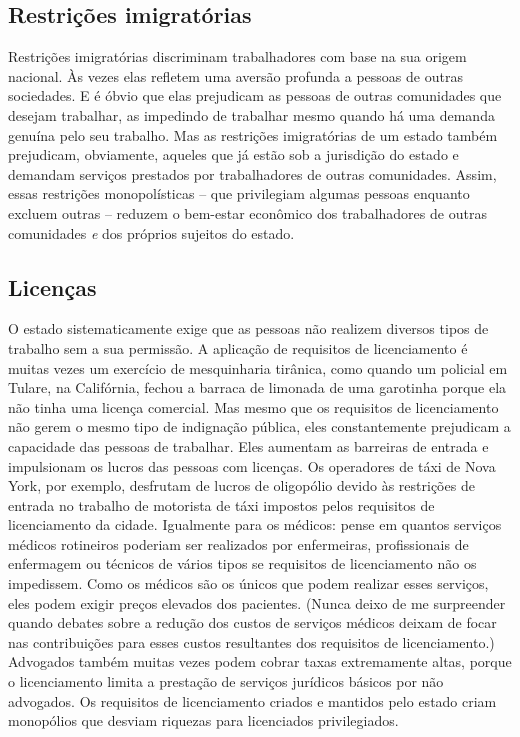 \subsection*{Restrições imigratórias}

Restrições imigratórias discriminam trabalhadores com base na sua origem nacional. Às vezes elas refletem uma aversão profunda a pessoas de outras sociedades. E é óbvio que elas prejudicam as pessoas de outras comunidades que desejam trabalhar, as impedindo de trabalhar mesmo quando há uma demanda genuína pelo seu trabalho. Mas as restrições imigratórias de um estado também prejudicam, obviamente, aqueles que já estão sob a jurisdição do estado e demandam serviços prestados por trabalhadores de outras comunidades. Assim, essas restrições monopolísticas -- que privilegiam algumas pessoas enquanto excluem outras -- reduzem o bem-estar econômico dos trabalhadores de outras comunidades \emph{e} dos próprios sujeitos do estado.

\subsection*{Licenças}

O estado sistematicamente exige que as pessoas não realizem diversos tipos de trabalho sem a sua permissão. A aplicação de requisitos de licenciamento é muitas vezes um exercício de mesquinharia tirânica, como quando um policial em Tulare, na Califórnia, fechou a barraca de limonada de uma garotinha porque ela não tinha uma licença comercial. Mas mesmo que os requisitos de licenciamento não gerem o mesmo tipo de indignação pública, eles constantemente prejudicam a capacidade das pessoas de trabalhar. Eles aumentam as barreiras de entrada e impulsionam os lucros das pessoas com licenças. Os operadores de táxi de Nova York, por exemplo, desfrutam de lucros de oligopólio devido às restrições de entrada no trabalho de motorista de táxi impostos pelos requisitos de licenciamento da cidade. Igualmente para os médicos: pense em quantos serviços médicos rotineiros poderiam ser realizados por enfermeiras, profissionais de enfermagem ou técnicos de vários tipos se requisitos de licenciamento não os impedissem. Como os médicos são os únicos que podem realizar esses serviços, eles podem exigir preços elevados dos pacientes. (Nunca deixo de me surpreender quando debates sobre a redução dos custos de serviços médicos deixam de focar nas contribuições para esses custos resultantes dos requisitos de licenciamento.) Advogados também muitas vezes podem cobrar taxas extremamente altas, porque o licenciamento limita a prestação de serviços jurídicos básicos por não advogados. Os requisitos de licenciamento criados e mantidos pelo estado criam monopólios que desviam riquezas para licenciados privilegiados.

